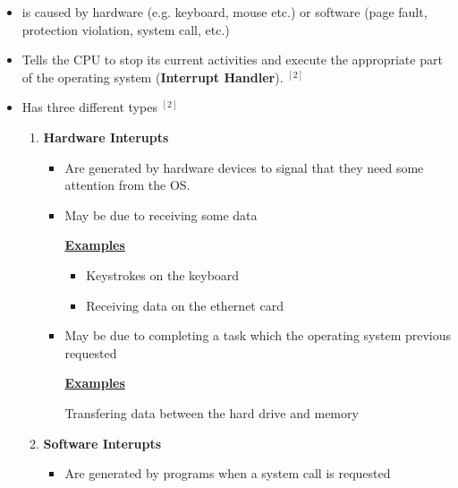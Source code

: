 \documentclass[12pt]{article}
\begin{document}
\begin{itemize}
    \item is caused by hardware (e.g. keyboard, mouse etc.) or software (page fault, protection violation, system call, etc.)
    \item Tells the CPU to stop its current activities and execute the appropriate part of the operating system (\textbf{Interrupt Handler}). $^{[2]}$
    \item Has three different types $^{[2]}$

    \begin{enumerate}[1)]
        \item \textbf{Hardware Interupts}

        \begin{itemize}
            \item Are generated by hardware devices to signal that they need some attention from the OS.
            \item May be due to receiving some data

            \bigskip

            \underline{\textbf{Examples}}

            \bigskip

            \begin{itemize}
                \item Keystrokes on the keyboard
                \item Receiving data on the ethernet card
            \end{itemize}

            \bigskip

            \item May be due to completing a task which the operating system previous requested

            \bigskip

            \underline{\textbf{Examples}}

            \bigskip

            Transfering data between the hard drive and memory
        \end{itemize}

        \bigskip

        \item \textbf{Software Interupts}

        \bigskip

        \begin{itemize}
            \item Are generated by programs when a system call is requested
        \end{itemize}


\end{enumerate}
\end{itemize}
\end{document}
